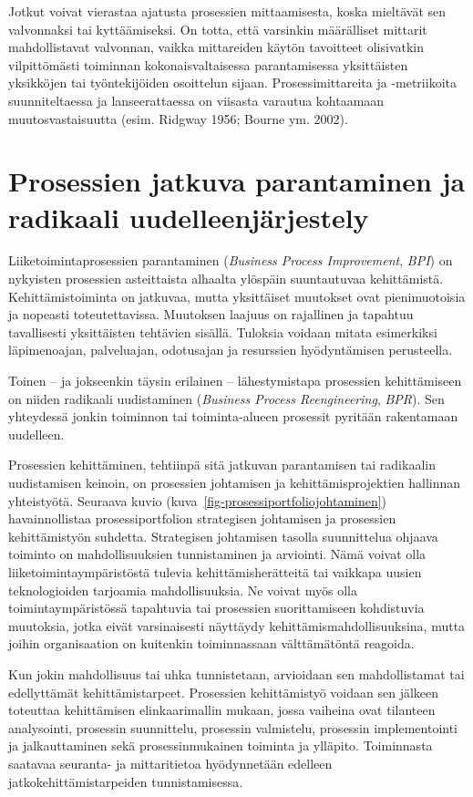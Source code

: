 \documentclass[
  finnish,
  letterpaper,
  DIV=11,
  numbers=noendperiod,
  oneside]{scrreprt}
\begin{document}
Jotkut voivat vierastaa ajatusta prosessien mittaamisesta, koska
mieltävät sen valvonnaksi tai kyttäämiseksi. On totta, että varsinkin
määrälliset mittarit mahdollistavat valvonnan, vaikka mittareiden käytön
tavoitteet olisivatkin vilpittömästi toiminnan kokonaisvaltaisessa
parantamisessa yksittäisten yksikköjen tai työntekijöiden osoittelun
sijaan. Prosessimittareita ja -metriikoita suunniteltaessa ja
lanseerattaessa on viisasta varautua kohtaamaan muutosvastaisuutta
(esim. Ridgway 1956; Bourne ym. 2002).

\section{Prosessien jatkuva parantaminen ja radikaali
uudelleenjärjestely}\label{prosessien-jatkuva-parantaminen-ja-radikaali-uudelleenjuxe4rjestely}

Liiketoimintaprosessien parantaminen (\emph{Business Process
Improvement}, \emph{BPI}) on nykyisten prosessien asteittaista alhaalta
ylöspäin suuntautuvaa kehittämistä. Kehittämistoiminta on jatkuvaa,
mutta yksittäiset muutokset ovat pienimuotoisia ja nopeasti
toteutettavissa. Muutoksen laajuus on rajallinen ja tapahtuu
tavallisesti yksittäisten tehtävien sisällä. Tuloksia voidaan mitata
esimerkiksi läpimenoajan, palveluajan, odotusajan ja resurssien
hyödyntämisen perusteella.

Toinen -- ja jokseenkin täysin erilainen -- lähestymistapa prosessien
kehittämiseen on niiden radikaali uudistaminen (\emph{Business Process
Reengineering}, \emph{BPR}). Sen yhteydessä jonkin toiminnon tai
toiminta-alueen prosessit pyritään rakentamaan uudelleen.

Prosessien kehittäminen, tehtiinpä sitä jatkuvan parantamisen tai
radikaalin uudistamisen keinoin, on prosessien johtamisen ja
kehittämisprojektien hallinnan yhteistyötä. Seuraava kuvio
(kuva~\ref{fig-prosessiportfoliojohtaminen}) havainnollistaa
prosessiportfolion strategisen johtamisen ja prosessien kehittämistyön
suhdetta. Strategisen johtamisen tasolla suunnittelua ohjaava toiminto
on mahdollisuuksien tunnistaminen ja arviointi. Nämä voivat olla
liiketoimintaympäristöstä tulevia kehittämisherätteitä tai vaikkapa
uusien teknologioiden tarjoamia mahdollisuuksia. Ne voivat myös olla
toimintaympäristössä tapahtuvia tai prosessien suorittamiseen
kohdistuvia muutoksia, jotka eivät varsinaisesti näyttäydy
kehittämismahdollisuuksina, mutta joihin organisaation on kuitenkin
toiminnassaan välttämätöntä reagoida.

Kun jokin mahdollisuus tai uhka tunnistetaan, arvioidaan sen
mahdollistamat tai edellyttämät kehittämistarpeet. Prosessien
kehittämistyö voidaan sen jälkeen toteuttaa kehittämisen elinkaarimallin
mukaan, jossa vaiheina ovat tilanteen analysointi, prosessin
suunnittelu, prosessin valmistelu, prosessin implementointi ja
jalkauttaminen sekä prosessinmukainen toiminta ja ylläpito. Toiminnasta
saatavaa seuranta- ja mittaritietoa hyödynnetään edelleen
jatkokehittämistarpeiden tunnistamisessa.
\end{document}
